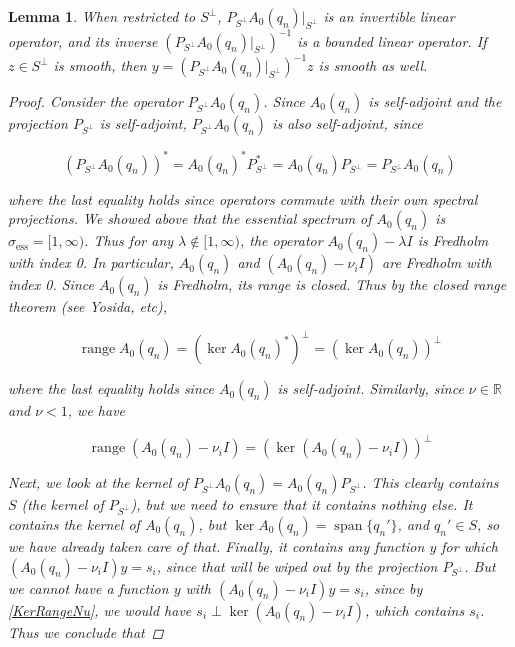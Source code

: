 \documentclass[12pt]{article}
\def\R{{\mathbb R}}
\DeclareMathOperator{\spn}{span}
\DeclareMathOperator{\ran}{range}
\newtheorem{lemma}{Lemma}
\begin{document}

\begin{lemma}\label{PA0inv}
When restricted to $S^\perp$, $P_{S^\perp} A_0(q_n) |_{S^\perp}$ is an invertible linear operator, and its inverse $(P_{S^\perp} A_0(q_n)  |_{S^\perp})^{-1}$ is a bounded linear operator. If $z \in S^\perp$ is smooth, then $y = (P_{S^\perp} A_0(q_n)  |_{S^\perp})^{-1} z$ is smooth as well.

\begin{proof}
Consider the operator $P_{S^\perp} A_0(q_n) $. Since $A_0(q_n) $ is self-adjoint and the projection $P_{S^\perp}$ is self-adjoint, $P_{S^\perp} A_0(q_n) $ is also self-adjoint, since

\[
(P_{S^\perp} A_0(q_n) )^* = A_0(q_n) ^* P_{S^\perp}^* = A_0(q_n)  P_{S^\perp} = P_{S^\perp} A_0(q_n) 
\]

where the last equality holds since operators commute with their own spectral projections. We showed above that the essential spectrum of $A_0(q_n) $ is $\sigma_{\text{ess}} = [1, \infty)$. Thus for any $\lambda \notin [1, \infty)$, the operator $A_0(q_n)  - \lambda I$ is Fredholm with index 0. In particular, $A_0(q_n) $ and $(A_0(q_n)  - \nu_i I)$ are Fredholm with index 0. Since $A_0(q_n) $ is Fredholm, its range is closed. Thus by the closed range theorem (see Yosida, etc), 

\begin{equation}
\ran A_0(q_n)  = (\ker A_0(q_n)^*)^\perp = (\ker A_0(q_n))^\perp
\end{equation}

where the last equality holds since $A_0(q_n)$ is self-adjoint. Similarly, since $\nu \in \R$ and $\nu < 1$, we have

\begin{equation}\label{KerRangeNu}
\ran (A_0(q_n) - \nu_i I) = (\ker (A_0(q_n) - \nu_i I))^\perp 
\end{equation}

Next, we look at the kernel of $P_{S^\perp} A_0(q_n) = A_0(q_n) P_{S^\perp}$. This clearly contains $S$ (the kernel of $P_{S^\perp}$), but we need to ensure that it contains nothing else. It contains the kernel of $A_0(q_n)$, but $\ker A_0(q_n) = \spn\{ q_n' \}$, and $q_n' \in S$, so we have already taken care of that. Finally, it contains any function $y$ for which $(A_0(q_n) - \nu_i I) y = s_i$, since that will be wiped out by the projection $P_{S^\perp}$. But we cannot have a function $y$ with $(A_0(q_n) - \nu_i I) y = s_i$, since by \eqref{KerRangeNu}, we would have $s_i \perp \ker (A_0(q_n) - \nu_i I)$, which contains $s_i$. Thus we conclude that


\end{proof}
\end{lemma}
\end{document}

